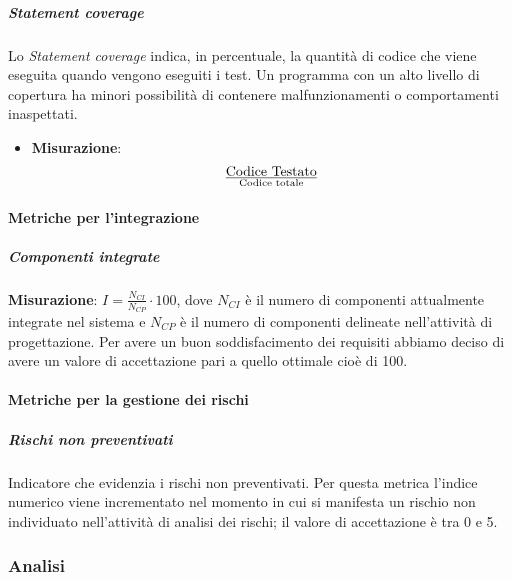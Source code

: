 \subparagraph{Statement coverage}
Lo \textit{Statement coverage} indica, in percentuale, la quantità di codice che viene eseguita quando vengono eseguiti i test. Un programma con un alto livello di copertura ha minori possibilità di contenere malfunzionamenti o comportamenti inaspettati.
\begin{itemize}
\item \textbf{Misurazione}:
\begin{displaymath}
{\text{Codice Testato}}\over{\text{Codice totale}}
\end{displaymath} 
\end{itemize}


\paragraph{Metriche per l'integrazione}
\subparagraph{Componenti integrate}
\textbf{Misurazione}: $I=\frac{N_{CI}}{N_{CP}} \cdot 100$, dove $N_{CI}$ è il numero di componenti attualmente integrate nel sistema e $N_{CP}$ è il numero di componenti delineate nell'attività di progettazione.
Per avere un buon soddisfacimento dei requisiti abbiamo deciso di avere un valore di accettazione pari a quello ottimale cioè di 100.

\paragraph{Metriche per la gestione dei rischi}

\subparagraph{Rischi non preventivati}
Indicatore che evidenzia i rischi non preventivati.
Per questa metrica l'indice numerico viene incrementato nel momento in cui si manifesta un rischio non individuato nell’attività di analisi dei rischi; il valore di accettazione è tra 0 e 5.


\subsubsection{Analisi}
